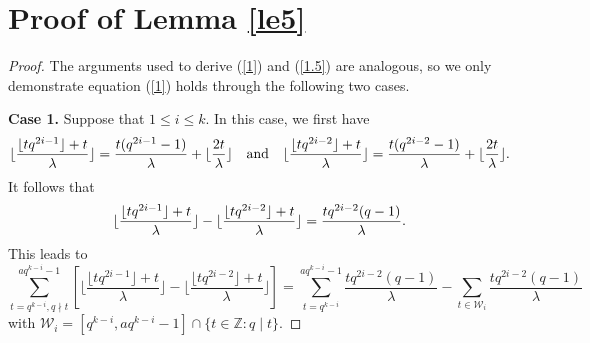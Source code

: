 \documentclass[journal,onecolumn]{IEEEtran}
\begin{document}
\section{Proof of Lemma \ref{le5}}
\begin{proof}
The arguments used to derive (\ref{1}) and (\ref{1.5}) are analogous, so we  only demonstrate equation (\ref{1}) holds through the following two cases. 

\textbf{Case 1.} Suppose that $1\leq i\leq k$.  
In this case, we first have 
\begin{equation}\notag
   \lfloor \frac{\lfloor tq^{2i-1}\rfloor+t}{\lambda}\rfloor= \frac{t(q^{2i-1}-1)}{\lambda}+\lfloor \frac{2t}{\lambda}\rfloor \quad \hbox{and}\quad \lfloor \frac{\lfloor tq^{2i-2}\rfloor+t}{\lambda}\rfloor= \frac{t(q^{2i-2}-1)}{\lambda}+\lfloor \frac{2t}{\lambda}\rfloor. 
\end{equation}
It follows that 
\begin{equation}\notag
    \lfloor \frac{\lfloor tq^{2i-1}\rfloor+t}{\lambda}\rfloor -\lfloor \frac{\lfloor tq^{2i-2}\rfloor+t}{\lambda}\rfloor =\frac{tq^{2i-2}(q-1)}{\lambda}.
\end{equation}
This  leads to 
\begin{equation}\label{3}
     \sum\limits_{t=q^{k-i},q\nmid t}^{aq^{k-i}-1}\left[\lfloor \frac{\lfloor tq^{2i-1}\rfloor+t}{\lambda}\rfloor -\lfloor \frac{\lfloor tq^{2i-2}\rfloor+t}{\lambda}\rfloor\right]=   \sum\limits_{t=q^{k-i}}^{aq^{k-i}-1}  \frac{tq^{2i-2}(q-1)}{\lambda} - \sum\limits_{t\in \mathcal{W}_i}\frac{tq^{2i-2}(q-1)}{\lambda}
\end{equation}
with $\mathcal{W}_i=\left[q^{k-i},aq^{k-i}-1
\right]\cap \{t\in \mathbb{Z}: q\mid t\}$. 



\end{proof}
\end{document}
